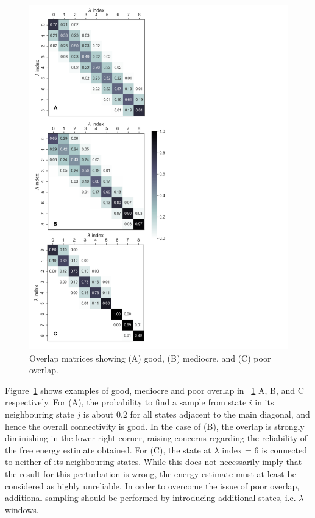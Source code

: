 \documentclass[9pt,bestpractices]{livecoms}
\begin{document}
\begin{figure}
\includegraphics[width=0.95\columnwidth]{figures/overlap/Overlap_plot.pdf}
\caption{\label{fig:overlap}Overlap matrices showing (A) good, (B) mediocre, and (C) poor overlap.}
\end{figure}
Figure~\ref{fig:overlap} shows examples of good, mediocre and poor overlap in ~\ref{fig:overlap} A, B, and C respectively. For (A), the probability to find a sample from state $i$ in its neighbouring state $j$ is about 0.2 for all states adjacent to the main diagonal, and hence the overall connectivity is good. In the case of (B), the overlap is strongly diminishing in the lower right corner, raising concerns regarding the reliability of the free energy estimate obtained. For (C), the state at $\lambda$ index = 6 is connected to neither of its neighbouring states. While this does not necessarily imply that the result for this perturbation is wrong, the energy estimate must at least be considered as highly unreliable.
In order to overcome the issue of poor overlap, additional sampling should be performed by introducing additional states, i.e. $\lambda$ windows.
\end{document}
